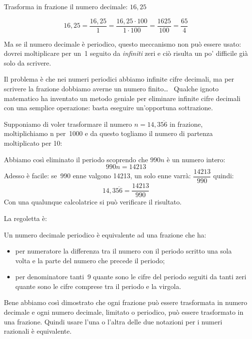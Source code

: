 \begin{esempio}{}{}
Trasforma in frazione il numero decimale: \(16,25\)
\begin{center}
 \[16,25 = \frac{16,25}{1} = \frac{16,25 \cdot 100}{1 \cdot 100} =
   \frac{1625}{100} = \frac{65}{4}\]
\end{center}
\end{esempio}

Ma se il numero decimale è periodico, questo meccanismo non può essere 
usato: dovrei moltiplicare per un~1 seguito da \emph{infiniti} zeri e ciò 
risulta un po' difficile già solo da scrivere.

Il problema è che nei numeri periodici abbiamo infinite cifre decimali, ma 
per scrivere la frazione dobbiamo averne un numero finito\dots~ 
Qualche ignoto matematico ha inventato un metodo geniale per eliminare 
infinite cifre decimali con una semplice operazione: basta eseguire 
un'opportuna sottrazione.

Supponiamo di voler trasformare il numero \(n = 14,3\overline{56}\) in 
frazione, moltiplichiamo n per~1000 e da questo togliamo il numero di 
partenza moltiplicato per 10:

\begin{center}
\sottrazione
%  
\end{center}

Abbiamo così eliminato il periodo scoprendo che \(990n\) è un numero 
intero:
\[990n = 14213\]
Adesso è facile: se~990 enne valgono 14213, un solo enne varrà:
\(\dfrac{14213}{990}\)
quindi:
\[14,3\overline{56} = \frac{14213}{990}\]
Con una qualunque calcolatrice si può verificare il risultato.

La regoletta è:

\begin{teorema}{}{}
 Un numero decimale periodico è equivalente ad una frazione che ha:
\begin{itemize}
 \item per numeratore la differenza tra il numero con il periodo scritto 
una sola volta e la parte del numero che precede il periodo;
 \item per denominatore tanti~9 quante sono le cifre del periodo seguiti da 
tanti zeri quante sono le cifre comprese tra il periodo e la virgola.
\end{itemize}
\end{teorema}

Bene abbiamo così dimostrato che ogni frazione può essere trasformata in 
numero decimale e ogni numero decimale, limitato o periodico, può essere 
trasformato in una frazione. Quindi usare l'una o l'altra delle due 
notazioni per i numeri razionali è equivalente.

